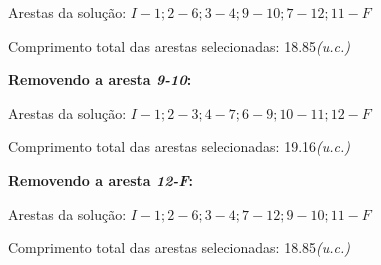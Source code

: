 \documentclass[runningheads]{llncs}
\begin{document}
    Arestas da solução: $I-1; 2-6; 3-4; 9-10; 7-12; 11-F$
    
    Comprimento total das arestas selecionadas: 18.85\textit{(u.c.)} 

\bigskip
\textbf{Removendo a aresta \textit{9-10}:}

    Arestas da solução: $I-1; 2-3; 4-7; 6-9; 10-11; 12-F$
    
    Comprimento total das arestas selecionadas: 19.16\textit{(u.c.)} 

\bigskip
\textbf{Removendo a aresta \textit{12-F}:}

    Arestas da solução: $I-1; 2-6; 3-4; 7-12; 9-10; 11-F$
    
    Comprimento total das arestas selecionadas: 18.85\textit{(u.c.)} 


\end{document}
